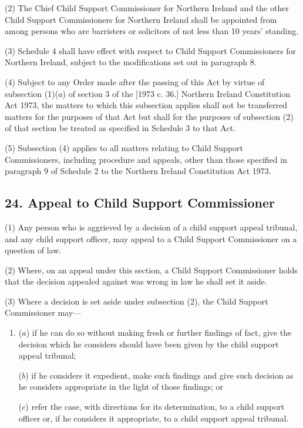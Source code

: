 \documentclass[12pt,a4paper]{article}
\begin{document}
(2) The Chief Child Support Commissioner for Northern Ireland and the other Child Support Commissioners for Northern Ireland shall be appointed from among persons who are barristers or solicitors of not less than 10 years' standing.

(3) Schedule 4 shall have effect with respect to Child Support Commissioners for Northern Ireland, subject to the modifications set out in paragraph 8.

(4) Subject to any Order made after the passing of this Act by virtue of subsection (1)($a$)  of section 3 of the [1973 c. 36.] Northern Ireland Constitution Act 1973, the matters to which this subsection applies shall not be transferred matters for the purposes of that Act but shall for the purposes of subsection (2)  of that section be treated as specified in Schedule 3 to that Act.

(5) Subsection (4)  applies to all matters relating to Child Support Commissioners, including procedure and appeals, other than those specified in paragraph 9 of Schedule 2 to the Northern Ireland Constitution Act 1973.


\subsection{24. Appeal to Child Support Commissioner}

(1) Any person who is aggrieved by a decision of a child support appeal tribunal, and any child support officer, may appeal to a Child Support Commissioner on a question of law.

(2) Where, on an appeal under this section, a Child Support Commissioner holds that the decision appealed against was wrong in law he shall set it aside.

(3) Where a decision is set aside under subsection (2), the Child Support Commissioner may—
\begin{enumerate}\item[]
($a$) if he can do so without making fresh or further findings of fact, give the decision which he considers should have been given by the child support appeal tribunal;

($b$) if he considers it expedient, make such findings and give such decision as he considers appropriate in the light of those findings; or

($c$) refer the case, with directions for its determination, to a child support officer or, if he considers it appropriate, to a child support appeal tribunal.
\end{enumerate}
\end{document}
